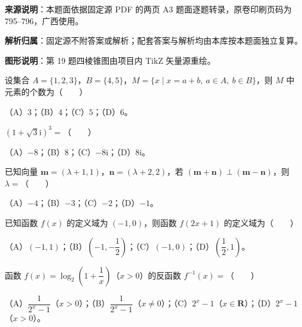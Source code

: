 

\begin{gknotice}
\textbf{来源说明}：本题面依据固定源 PDF 的两页 A3 题面逐题转录，原卷印刷页码为 795–796，广西使用。

\textbf{解析归属}：固定源不附答案或解析；配套答案与解析均由本库按本题面独立复算。

\textbf{图形说明}：第 19 题四棱锥图由项目内 TikZ 矢量源重绘。
\end{gknotice}


\begin{question}
设集合 $A=\{1,2,3\}$，$B=\{4,5\}$，$M=\{x\mid x=a+b,\ a\in A,\ b\in B\}$，则 $M$ 中元素的个数为\mbox{（　　）}

（A）$3$；（B）$4$；（C）$5$；（D）$6$。

\end{question}
\begin{question}
$(1+\sqrt3\mathrm i)^3=$\mbox{（　　）}

（A）$-8$；（B）$8$；（C）$-8\mathrm i$；（D）$8\mathrm i$。

\end{question}
\begin{question}
已知向量 $\boldsymbol m=(\lambda+1,1)$，$\boldsymbol n=(\lambda+2,2)$，若 $(\boldsymbol m+\boldsymbol n)\perp(\boldsymbol m-\boldsymbol n)$，则 $\lambda=$\mbox{（　　）}

（A）$-4$；（B）$-3$；（C）$-2$；（D）$-1$。

\end{question}
\begin{question}
已知函数 $f(x)$ 的定义域为 $(-1,0)$，则函数 $f(2x+1)$ 的定义域为\mbox{（　　）}

（A）$(-1,1)$；（B）$\left(-1,-\dfrac12\right)$；（C）$(-1,0)$；（D）$\left(\dfrac12,1\right)$。

\end{question}
\begin{question}
函数 $f(x)=\log_2\left(1+\dfrac1x\right)$（$x>0$）的反函数 $f^{-1}(x)=$\mbox{（　　）}

（A）$\dfrac1{2^x-1}$（$x>0$）；（B）$\dfrac1{2^x-1}$（$x\neq0$）；（C）$2^x-1$（$x\in\mathbf R$）；（D）$2^x-1$（$x>0$）。

\end{question}
